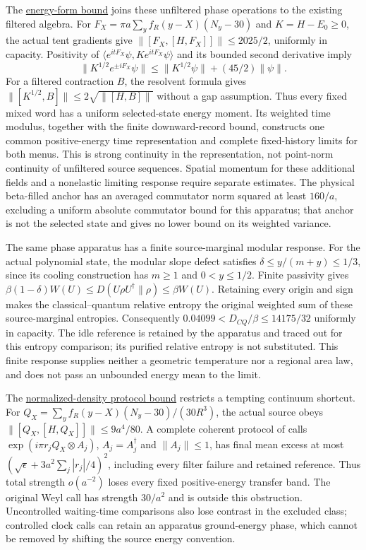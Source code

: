 The \href{https://github.com/FloatingPragma/observer-patch-holography/blob/main/model/particle_primary_current_tail/PROOF.md}{energy-form bound}
joins these unfiltered phase operations to the existing filtered algebra.
For $F_X=\pi a\sum_y f_R(y-X)(N_y-30)$ and $K=H-E_0\ge0$, the actual
tent gradients give $\|[F_X,[H,F_X]]\|\le2025/2$, uniformly in capacity.
Positivity of $\langle e^{itF_X}\psi,K e^{itF_X}\psi\rangle$ and its
bounded second derivative imply
\[
 \|K^{1/2}e^{\pm iF_X}\psi\|
       \le\|K^{1/2}\psi\|+(45/2)\|\psi\|.
\]
For a filtered contraction $B$, the resolvent formula gives
$\|[K^{1/2},B]\|\le2\sqrt{\|[H,B]\|}$ without a gap assumption.
Thus every fixed mixed word has a uniform selected-state energy moment.
Its weighted time modulus, together with the finite downward-record bound,
constructs one common positive-energy time representation and complete
fixed-history limits for both menus. This is strong continuity in the
representation, not point-norm continuity of unfiltered source sequences.
Spatial momentum for these additional fields and a nonelastic limiting
response require separate estimates. The physical beta-filled anchor has
an averaged commutator norm squared at least $160/a$, excluding a uniform
absolute commutator bound for this apparatus; that anchor is not the
selected state and gives no lower bound on its weighted variance.

The same phase apparatus has a finite source-marginal modular response.
For the actual polynomial state, the modular slope defect satisfies
$\delta\le y/(m+y)\le1/3$, since its cooling construction has
$m\ge1$ and $0<y\le1/2$. Finite passivity gives
$\beta(1-\delta)W(U)\le D(U\rho U^\dagger\|\rho)\le\beta W(U)$.
Retaining every origin and sign makes the classical--quantum relative
entropy the original weighted sum of these source-marginal entropies.
Consequently $0.04099<D_{CQ}/\beta\le14175/32$ uniformly in capacity.
The idle reference is retained by the apparatus and traced out for this
entropy comparison; its purified relative entropy is not substituted.
This finite response supplies neither a geometric temperature nor a
regional area law, and does not pass an unbounded energy mean to the limit.

The \href{https://github.com/FloatingPragma/observer-patch-holography/blob/main/model/particle_primary_weighted_survival/PROOF.md}{normalized-density protocol bound}
restricts a tempting continuum shortcut. For
$Q_X=\sum_y f_R(y-X)(N_y-30)/(30R^3)$, the actual source obeys
$\|[Q_X,[H,Q_X]]\|\le9a^4/80$. A complete coherent protocol of calls
$\exp(i\pi r_jQ_X\otimes A_j)$, $A_j=A_j^\dagger$ and $\|A_j\|\le1$, has final mean excess
at most $(\sqrt\epsilon+3a^2\sum_j|r_j|/4)^2$, including every filter
failure and retained reference. Thus total strength $o(a^{-2})$ loses
every fixed positive-energy transfer band. The original Weyl call has
strength $30/a^2$ and is outside this obstruction. Uncontrolled waiting-time
comparisons also lose contrast in the excluded class; controlled clock
calls can retain an apparatus ground-energy phase, which cannot be removed
by shifting the source energy convention.

